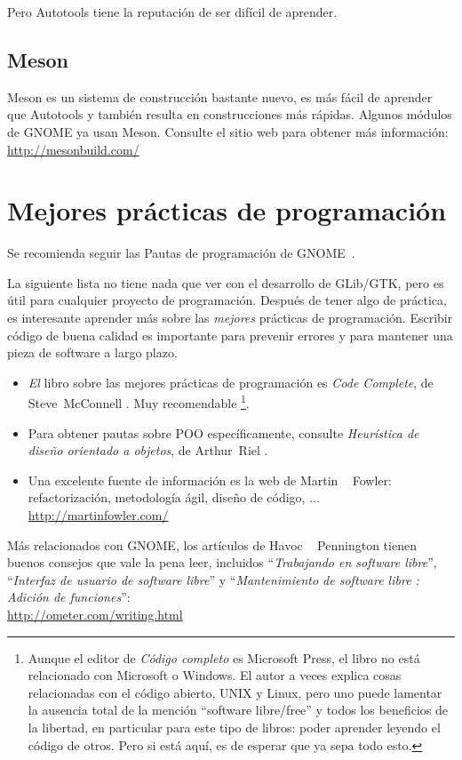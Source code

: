 Pero Autotools tiene la reputación de ser difícil de aprender.

\subsection{Meson}

Meson es un sistema de construcción bastante nuevo, es más fácil de aprender que Autotools y también resulta en construcciones más rápidas. Algunos módulos de GNOME ya usan Meson. Consulte el sitio web para obtener más información:\\
\url{http://mesonbuild.com/}

\section{Mejores prácticas de programación}

Se recomienda seguir las Pautas de programación de GNOME~\cite{gnome-programming-guidelines}.

La siguiente lista no tiene nada que ver con el desarrollo de GLib/GTK, pero es útil para cualquier proyecto de programación. Después de tener algo de práctica, es interesante aprender más sobre las \emph{mejores} prácticas de programación. Escribir código de buena calidad es importante para prevenir errores y para mantener una pieza de software a largo plazo.

\begin{itemize}
  \item \emph{El} libro sobre las mejores prácticas de programación es \emph{Code Complete}, de Steve~McConnell \cite{code-complete}. Muy recomendable \footnote{Aunque el editor de \emph{Código completo} es Microsoft Press, el libro no está relacionado con Microsoft o Windows. El autor a veces explica cosas relacionadas con el código abierto, UNIX y Linux, pero uno puede lamentar la ausencia total de la mención ``software libre/free'' y todos los beneficios de la libertad, en particular para este tipo de libros: poder aprender leyendo el código de otros. Pero si está aquí, es de esperar que ya sepa todo esto.}.

  \item Para obtener pautas sobre POO específicamente, consulte \emph{Heurística de diseño orientado a objetos}, de Arthur~Riel \cite{oop-book}.

  \item Una excelente fuente de información es la web de Martin ~ Fowler: refactorización, metodología ágil, diseño de código, ...\\
  \url{http://martinfowler.com/}
\end{itemize}

Más relacionados con GNOME, los artículos de Havoc ~ Pennington tienen buenos consejos que vale la pena leer, incluidos ``\emph{Trabajando en software libre}'', ``\emph{Interfaz de usuario de software libre}'' y ``\emph{Mantenimiento de software libre : Adición de funciones}'':\\
\url{http://ometer.com/writing.html}